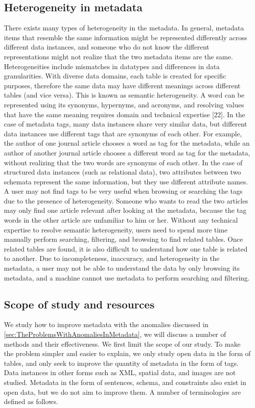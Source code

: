 \subsection{Heterogeneity in metadata}
There exists many types of heterogeneity in the metadata. In general, metadata items that resemble the same information might be represented differently across different data instances, and someone who do not know the different representations might not realize that the two metadata items are the same. Heterogeneities include mismatches in datatypes and differences in data granularities. With diverse data domains, each table is created for specific purposes, therefore the same data may have different meanings across different tables (and vice versa). This is known as semantic heterogeneity. A word can be represented using its synonyms, hypernyms, and acronyms, and resolving values that have the same meaning requires domain and technical expertise [22].
In the case of metadata tags, many data instances share very similar data, but different data instances use different tags that are synonyms of each other. For example, the author of one journal article chooses a word as tag for the metadata, while an author of another journal article chooses a different word as tag for the metadata, without realizing that the two words are synonyms of each other. In the case of structured data instances (such as relational data), two attributes between two schemata represent the same information, but they use different attribute names.
A user may not find tags to be very useful when browsing or searching the tags due to the presence of heterogeneity. Someone who wants to read the two articles may only find one article relevant after looking at the metadata, because the tag words in the other article are unfamiliar to him or her. Without any technical expertise to resolve semantic heterogeneity, users need to
spend more time manually perform searching, filtering, and browsing to find related tables. Once related tables are found, it is also difficult to understand how one table is related to another.
Due to incompleteness, inaccuracy, and heterogeneity in the metadata, a user may not be able to understand the data by only browsing its metadata, and a machine cannot use metadata to perform searching and filtering.

\subsection{Scope of study and resources}
We study how to improve metadata with the anomalies discussed in \autoref{sec:TheProblemsWithAnomaliesInMetadata}, we will discuss a number of methods and their effectiveness. We first limit the scope of our study. To make the problem simpler and easier to explain, we only study open data in the form of tables, and only seek to improve the quantity of metadata in the form of tags. Data instances in other forms such as XML, spatial data, and images are not studied. Metadata in the form of sentences, schema, and constraints also exist in open data, but we do not aim to improve them. A number of terminologies are defined as follows.

